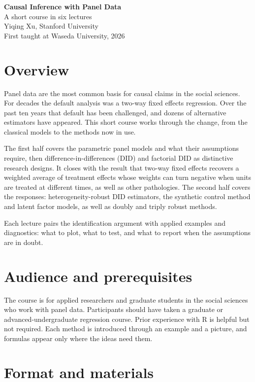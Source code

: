 \documentclass[11pt]{article}
\begin{document}
\begin{center}
{\LARGE\bfseries\color{Deep} Causal Inference with Panel Data}\\[4pt]
{\large A short course in six lectures}\\[8pt]
Yiqing Xu, Stanford University\\
First taught at Waseda University, 2026
\end{center}

\section*{Overview}

Panel data are the most common basis for causal claims in the social sciences. For decades the default analysis was a two-way fixed effects regression. Over the past ten years that default has been challenged, and dozens of alternative estimators have appeared. This short course works through the change, from the classical models to the methods now in use.

The first half covers the parametric panel models and what their assumptions require, then difference-in-differences (DID) and factorial DID as distinctive research designs. It closes with the result that two-way fixed effects recovers a weighted average of treatment effects whose weights can turn negative when units are treated at different times, as well as other pathologies. The second half covers the responses: heterogeneity-robust DID estimators, the synthetic control method and latent factor models, as well as doubly and triply robust methods.

Each lecture pairs the identification argument with applied examples and diagnostics: what to plot, what to test, and what to report when the assumptions are in doubt.

\section*{Audience and prerequisites}

The course is for applied researchers and graduate students in the social sciences who work with panel data. Participants should have taken a graduate or advanced-undergraduate regression course. Prior experience with R is helpful but not required. Each method is introduced through an example and a picture, and formulas appear only where the ideas need them.

\section*{Format and materials}
\end{document}
